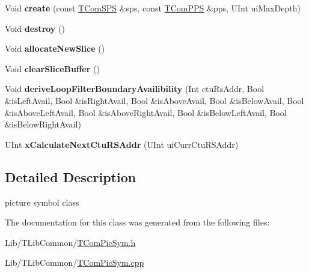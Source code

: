 \begin{DoxyCompactItemize}
\item 
\mbox{\label{class_t_com_pic_sym_adcae731e091189f6936526b6b58c43ee}} 
Void {\bfseries create} (const \hyperlink{class_t_com_s_p_s}{T\+Com\+S\+PS} \&sps, const \hyperlink{class_t_com_p_p_s}{T\+Com\+P\+PS} \&pps, U\+Int ui\+Max\+Depth)
\item 
\mbox{\label{class_t_com_pic_sym_a64ef9ef41c3542b9a58f3708590121d3}} 
Void {\bfseries destroy} ()
\item 
\mbox{\label{class_t_com_pic_sym_aa0a96818a79995f1c026284e9e5ebc69}} 
Void {\bfseries allocate\+New\+Slice} ()
\item 
\mbox{\label{class_t_com_pic_sym_a3b0ef903596fe1c2717fb59ad7b5a497}} 
Void {\bfseries clear\+Slice\+Buffer} ()
\item 
\mbox{\label{class_t_com_pic_sym_a4cb4ebc4083a779a8992459a5b90c251}} 
Void {\bfseries derive\+Loop\+Filter\+Boundary\+Availibility} (Int ctu\+Rs\+Addr, Bool \&is\+Left\+Avail, Bool \&is\+Right\+Avail, Bool \&is\+Above\+Avail, Bool \&is\+Below\+Avail, Bool \&is\+Above\+Left\+Avail, Bool \&is\+Above\+Right\+Avail, Bool \&is\+Below\+Left\+Avail, Bool \&is\+Below\+Right\+Avail)
\item 
\mbox{\label{class_t_com_pic_sym_a1d419584a5912523a5f221eec1550aed}} 
U\+Int {\bfseries x\+Calculate\+Next\+Ctu\+R\+S\+Addr} (U\+Int ui\+Curr\+Ctu\+R\+S\+Addr)
\end{DoxyCompactItemize}


\subsection{Detailed Description}
picture symbol class 

The documentation for this class was generated from the following files\+:\begin{DoxyCompactItemize}
\item 
Lib/\+T\+Lib\+Common/\hyperlink{_t_com_pic_sym_8h}{T\+Com\+Pic\+Sym.\+h}\item 
Lib/\+T\+Lib\+Common/\hyperlink{_t_com_pic_sym_8cpp}{T\+Com\+Pic\+Sym.\+cpp}\end{DoxyCompactItemize}
